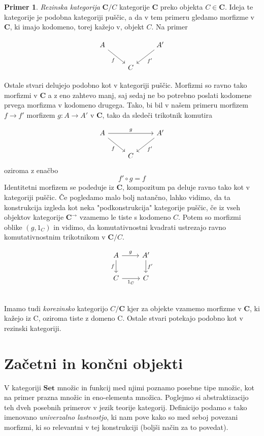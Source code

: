 \documentclass[12pt,a4paper]{book}
\theoremstyle{definition}
\theoremstyle{plain}
\theoremstyle{definition}
\newtheorem{primer}{Primer}[section]
\theoremstyle{remark}
\newcommand{\cat}[1]{\textbf{#1}}
\begin{document}
\begin{primer}
\textit{Rezinska kategorija} $\cat{C}/C$ kategorije $\cat{C}$ preko objekta $C \in \cat{C}$. Ideja te kategorije je podobna kategoriji puščic, a da v tem primeru gledamo morfizme v $\cat{C}$, ki imajo kodomeno, torej kažejo v, objekt $C$. Na primer

\[ \begin{tikzcd}
A \arrow[rd, "f"'] & & \arrow[ld, "f'"] A' \\
& C &
\end{tikzcd} \]

Ostale stvari delujejo podobno kot v kategoriji puščic. Morfizmi so ravno tako morfizmi v $\cat{C}$ a z eno zahtevo manj, saj sedaj ne bo potrebno poslati kodomene prvega morfizma v kodomeno drugega. Tako, bi bil v našem primeru morfizem $f \to f'$ morfizem $g : A \to A'$ v $\cat{C}$, tako da sledeči trikotnik komutira

\[ \begin{tikzcd}
A \arrow[rd, "f"'] \ar[rr, "g"] & & \arrow[ld, "f'"] A' \\
& C &
\end{tikzcd} \]
oziroma z enačbo
$$f' \circ g = f$$
Identitetni morfizem se podeduje iz $\cat{C}$, kompozitum pa deluje ravno tako kot v kategoriji puščic. Če pogledamo malo bolj natančno, lahko vidimo, da ta konstrukcija izgleda kot neka "podkonstrukcija" kategorije puščic, če iz vseh objektov kategorije $\cat{C}^{\rightarrow}$ vzamemo le tiste s kodomeno $C$. Potem so morfizmi oblike $(g, 1_C)$ in vidimo, da komutativnostni kvadrati ustrezajo ravno komutativnostnim trikotnikom v $\cat{C}/C$.

\[ \begin{tikzcd}
A \ar[d, "f"'] \ar[r, "g"] & A' \ar[d, "f'"] \\
C \ar[r, "1_C"'] & C \\
\end{tikzcd} \]

Imamo tudi \textit{korezinsko} kategorijo $C/\cat{C}$ kjer za objekte vzamemo morfizme v $\cat{C}$, ki kažejo iz C, oziroma tiste z domeno C. Ostale stvari potekajo podobno kot v rezinski kategoriji.

\end{primer}

\section{Začetni in končni objekti}
V kategoriji $\cat{Set}$ množic in funkcij med njimi poznamo posebne tipe množic, kot na primer prazna množic in eno-elementa množica. Poglejmo si abstraktizacijo teh dveh posebnih primerov v jezik teorije kategorij. Definicijo podamo s tako imenovano \textit{univerzalno lastnostjo}, ki nam pove kako so med seboj povezani morfizmi, ki so relevantni v tej konstrukciji (boljši način za to povedat).
\end{document}
